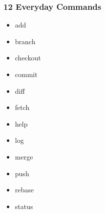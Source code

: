 \begin{frame}
    \frametitle{12 Everyday Commands}
    \begin{multicols}{3}
        \begin{itemize}
            \setlength\itemsep{3em}
            \item \alert{add}
            \item \alert{branch}
            \item \alert{checkout}
            \item \alert{commit}
            \item \alert{diff}
            \item fetch
            \item \alert{help}
            \item \alert{log}
            \item \alert{merge}
            \item push
            \item rebase
            \item \alert{status}
        \end{itemize}
    \end{multicols}
\end{frame}
